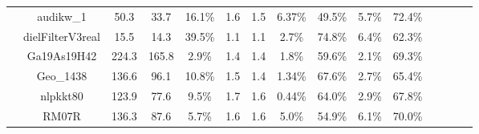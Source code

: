\begin{tabular}{p{.75cm} cccccccccccccc}
%
&audikw\_1			& 50.3	& 33.7	& 16.1\%	& 1.6	& 1.5	& 6.37\%	& 49.5\%	& 5.7\% 	& 72.4\% 	\\
%
&dielFilterV3real	& 15.5	& 14.3	& 39.5\%	& 1.1	& 1.1	& 2.7\%	& 74.8\%	& 6.4\% 	& 62.3\% 	\\ 
%
%
&Ga19As19H42		& 224.3	& 165.8	& 2.9\%	& 1.4	& 1.4	& 1.8\%	& 59.6\%	& 2.1\% 	& 69.3\% 	\\
%
&Geo\_1438			& 136.6	& 96.1	& 10.8\%	& 1.5	& 1.4	& 1.34\%	& 67.6\%	& 2.7\% 	& 65.4\% 	\\
%
&nlpkkt80			& 123.9	& 77.6 & 9.5\%	& 1.7	& 1.6	& 0.44\%	& 64.0\%	& 2.9\% 	& 67.8\% 	\\
%
&RM07R				& 136.3	& 87.6	& 5.7\%	& 1.6	& 1.6	& 5.0\%	& 54.9\%	& 6.1\%	& 70.0\% 	\\
%
\bottomrule 
\end{tabular}  




